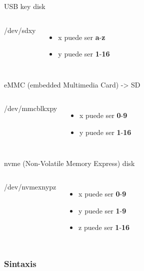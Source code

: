 \begin{frame}[c]{USB key disk}

  \begin{columns}
      {\huge /dev/sd{\color{red}x}{\color{blue}y}}
      \begin{itemize}
        \item {\color{red}x} puede ser \textbf{a}-\textbf{z}
        \item {\color{blue}y} puede ser \textbf{1}-\textbf{16}
      \end{itemize}
  \end{columns}
\end{frame}

\begin{frame}[c]{eMMC (embedded Multimedia Card) -> SD}

  \begin{columns}
      {\huge /dev/mmcblk{\color{red}x}p{\color{blue}y}}
      \begin{itemize}
        \item {\color{red}x} puede ser \textbf{0}-\textbf{9}
        \item {\color{blue}y} puede ser \textbf{1}-\textbf{16}
      \end{itemize}
  \end{columns}
\end{frame}

\begin{frame}[c]{nvme (Non-Volatile Memory Express) disk}

  \begin{columns}
      {\huge /dev/nvme{\color{red}x}n{\color{blue}y}p{\color{magenta}z}}
      \begin{itemize}
        \item {\color{red}x} puede ser \textbf{0}-\textbf{9}
        \item {\color{blue}y} puede ser \textbf{1}-\textbf{9}
        \item {\color{magenta}z} puede ser \textbf{1}-\textbf{16}
      \end{itemize}
  \end{columns}
\end{frame}


\begin{frame}[fragile]
  \frametitle{Sintaxis}

  \vspace{\baselineskip}
\end{frame}
